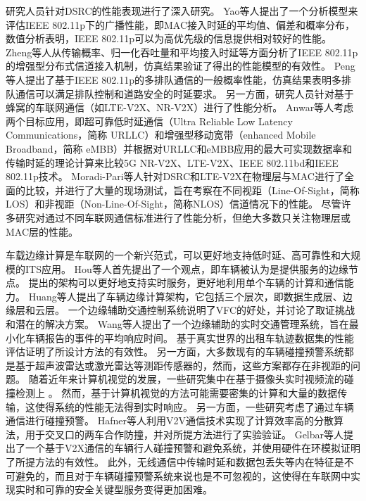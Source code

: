 研究人员针对DSRC的性能表现进行了深入研究。
Yao等人\cite{yao2013delay}提出了一个分析模型来评估IEEE 802.11p下的广播性能，即MAC接入时延的平均值、偏差和概率分布，数值分析表明，IEEE 802.11p可以为高优先级的信息提供相对较好的性能。
Zheng等人\cite{zheng2015performance}从传输概率、归一化吞吐量和平均接入时延等方面分析了IEEE 802.11p的增强型分布式信道接入机制，仿真结果验证了得出的性能模型的有效性。
Peng等人\cite{peng2016performance}提出了基于IEEE 802.11p的多排队通信的一般概率性能，仿真结果表明多排队通信可以满足排队控制和道路安全的时延要求。
另一方面，研究人员针对基于蜂窝的车联网通信（如LTE-V2X、NR-V2X）进行了性能分析。
Anwar等人\cite{anwar2019physical}考虑两个目标应用，即超可靠低时延通信（Ultra Reliable Low Latency Communications，简称 URLLC）和增强型移动宽带（enhanced Mobile Broadband，简称 eMBB）并根据对URLLC和eMBB应用的最大可实现数据率和传输时延的理论计算来比较5G NR-V2X、LTE-V2X、IEEE 802.11bd和IEEE 802.11p技术。
Moradi-Pari等人\cite{moradi-pari2023dsrc}针对DSRC和LTE-V2X在物理层与MAC进行了全面的比较，并进行了大量的现场测试，旨在考察在不同视距（Line-Of-Sight，简称LOS）和非视距（Non-Line-Of-Sight，简称NLOS）信道情况下的性能。
尽管许多研究对通过不同车联网通信标准进行了性能分析，但绝大多数只关注物理层或MAC层的性能。

车载边缘计算是车联网的一个新兴范式，可以更好地支持低时延、高可靠性和大规模的ITS应用。
Hou等人\cite{hou2016vehicular}首先提出了一个观点，即车辆被认为是提供服务的边缘节点。
提出的架构可以更好地支持实时服务，更好地利用单个车辆的计算和通信能力。
Huang等人\cite{huang2017vehicular}提出了车辆边缘计算架构，它包括三个层次，即数据生成层、边缘层和云层。
一个边缘辅助交通控制系统说明了VFC的好处，并讨论了取证挑战和潜在的解决方案。
Wang等人\cite{wang2018offloading}提出了一个边缘辅助的实时交通管理系统，旨在最小化车辆报告的事件的平均响应时间。
基于真实世界的出租车轨迹数据集的性能评估证明了所设计方法的有效性。
另一方面，大多数现有的车辆碰撞预警系统都是基于超声波雷达或激光雷达等测距传感器的\cite{song2018real, wu2019series}，然而，这些方案都存在非视距的问题。
随着近年来计算机视觉的发展，一些研究集中在基于摄像头实时视频流的碰撞检测上 \cite{wang2016vision, song2018lane}。
然而，基于计算机视觉的方法可能需要密集的计算和大量的数据传输，这使得系统的性能无法得到实时响应。 
另一方面，一些研究考虑了通过车辆通信进行碰撞预警。
Hafner等人\cite{hafner2013cooperative}利用V2V通信技术实现了计算效率高的分散算法，用于交叉口的两车合作防撞，并对所提方法进行了实验验证。
Gelbar等人\cite{gelbal2017elastic}提出了一个基于V2X通信的车辆行人碰撞预警和避免系统，并使用硬件在环模拟证明了所提方法的有效性。
此外，无线通信中传输时延和数据包丢失等内在特征是不可避免的，而且对于车辆碰撞预警系统来说也是不可忽视的，这使得在车联网中实现实时和可靠的安全关键型服务变得更加困难。

